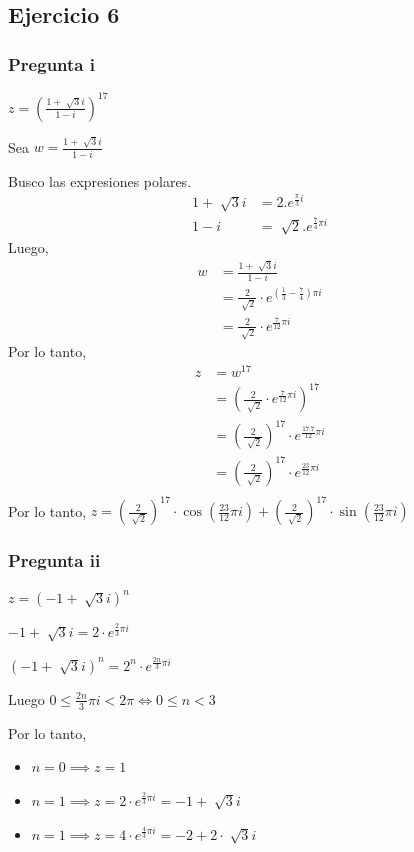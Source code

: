 \subsection{Ejercicio 6}

\subsubsection{Pregunta i}

$ z = (\frac{1+\sqrt[]{3}i}{1-i})^{17} $

Sea $ w = \frac{1+\sqrt[]{3}i}{1-i} $

Busco las expresiones polares.
\begin{align*}
    1+\sqrt[]{3}i &= 2. e^{\frac{\pi}{3}i} \\
    1-i &= \sqrt[]{2}. e^{\frac{7}{4}\pi i}
\end{align*}
Luego,
\begin{align*}
    w &= \frac{1+\sqrt[]{3}i}{1-i} \\
    &= \frac{2}{\sqrt[]{2}} \cdot e^{(\frac{1}{3} - \frac{7}{4})\pi i} \\
    &= \frac{2}{\sqrt[]{2}} \cdot e^{\frac{7}{12}\pi i}
\end{align*}
Por lo tanto,
\begin{align*}
    z &= w^{17} \\
    &= \left(\frac{2}{\sqrt[]{2}} \cdot e^{\frac{7}{12}\pi i}\right)^{17} \\
    &= \left(\frac{2}{\sqrt[]{2}}\right)^{17} \cdot e^{\frac{17.7}{12}\pi i} \\
    &= \left(\frac{2}{\sqrt[]{2}}\right)^{17} \cdot e^{\frac{23}{12}\pi i} \\
\end{align*}
Por lo tanto,
$ z = \left(\frac{2}{\sqrt[]{2}}\right)^{17} \cdot \cos(\frac{23}{12}\pi i) + \left(\frac{2}{\sqrt[]{2}}\right)^{17} \cdot \sin(\frac{23}{12}\pi i) $

\subsubsection{Pregunta ii}

$ z = (-1+\sqrt[]{3}i)^{n} $

$ -1+\sqrt[]{3}i = 2\cdot e^{\frac{2}{3}\pi i} $

$ (-1+\sqrt[]{3}i)^{n} = 2^n \cdot e^{\frac{2n}{3}\pi i} $

Luego $ 0 \leq \frac{2n}{3}\pi i < 2\pi \iff 0 \leq n < 3 $

Por lo tanto,
\begin{itemize}
    \item $ n = 0 \implies z = 1 $
    \item $ n = 1 \implies z = 2\cdot e^{\frac{2}{3}\pi i} = -1+\sqrt[]{3}i $
    \item $ n = 1 \implies z = 4\cdot e^{\frac{4}{3}\pi i} = -2+ 2 \cdot \sqrt[]{3}i $
\end{itemize}


